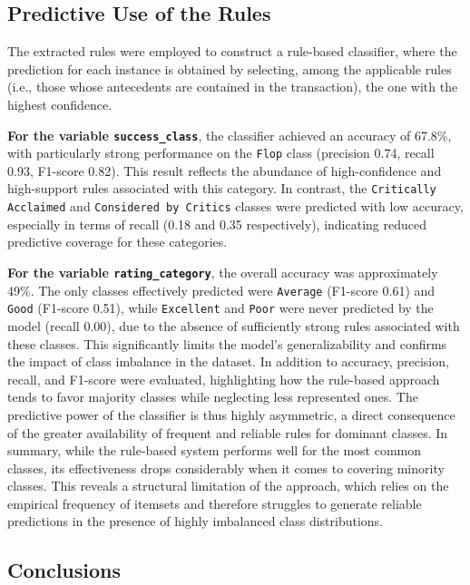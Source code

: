 \documentclass[10pt]{article}
\begin{document}
\subsection{Predictive Use of the Rules}
The extracted rules were employed to construct a rule-based classifier, where the prediction for each instance is obtained by selecting, among the applicable rules (i.e., those whose antecedents are contained in the transaction), the one with the highest confidence.

\textbf{For the variable \texttt{success\_class}}, the classifier achieved an accuracy of 67.8\%, with particularly strong performance on the \texttt{Flop} class (precision 0.74, recall 0.93, F1-score 0.82). This result reflects the abundance of high-confidence and high-support rules associated with this category. In contrast, the \texttt{Critically Acclaimed} and \texttt{Considered by Critics} classes were predicted with low accuracy, especially in terms of recall (0.18 and 0.35 respectively), indicating reduced predictive coverage for these categories.

\textbf{For the variable \texttt{rating\_category}}, the overall accuracy was approximately 49\%. The only classes effectively predicted were \texttt{Average} (F1-score 0.61) and \texttt{Good} (F1-score 0.51), while \texttt{Excellent} and \texttt{Poor} were never predicted by the model (recall 0.00), due to the absence of sufficiently strong rules associated with these classes. This significantly limits the model's generalizability and confirms the impact of class imbalance in the dataset.
In addition to accuracy, precision, recall, and F1-score were evaluated, highlighting how the rule-based approach tends to favor majority classes while neglecting less represented ones. The predictive power of the classifier is thus highly asymmetric, a direct consequence of the greater availability of frequent and reliable rules for dominant classes.
In summary, while the rule-based system performs well for the most common classes, its effectiveness drops considerably when it comes to covering minority classes. This reveals a structural limitation of the approach, which relies on the empirical frequency of itemsets and therefore struggles to generate reliable predictions in the presence of highly imbalanced class distributions.

\subsection{Conclusions}
\end{document}
